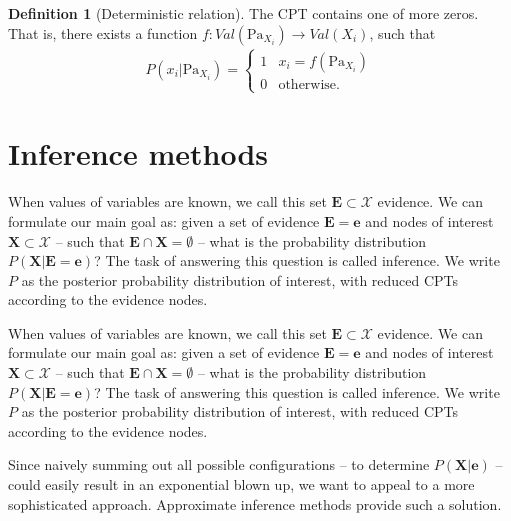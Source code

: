 \documentclass[a4paper, twoside, 11pt]{report}
\theoremstyle{plain}
\theoremstyle{definition}
\newtheorem{definition}[thm]{Definition}
\theoremstyle{remark}
\newcommand{\X}{{\mathcal{X}}}
\newcommand{\bfe}{{\mathbf{e}}}
\newcommand{\bfX}{{\mathbf{X}}}
\newcommand{\bfE}{{\mathbf{E}}}
\begin{document}
\begin{definition}[Deterministic relation]
The CPT contains one of more zeros. That is, there exists a function $f: Val(\text{Pa}_{X_i}) \to Val(X_i)$, such that
\begin{align*}
P(x_i | \text{Pa}_{X_i}) =
\begin{cases}
1 & x_i = f(\text{Pa}_{X_i}) \\ 
0 & \text{otherwise}.
\end{cases}
\end{align*} 
\end{definition}


\section{Inference methods}
When values of variables are known, we call this set $\bfE \subset \X$ evidence. We can formulate our main goal as: given a set of evidence $\bfE = \bfe$ and nodes of interest $\bfX \subset \X$ -- such that $\bfE \cap \bfX = \emptyset$ -- what is the probability distribution $P(\bfX | \bfE = \bfe)$? The task of answering this question is called inference. We write $P$ as the posterior probability distribution of interest, with reduced CPTs according to the evidence nodes.

When values of variables are known, we call this set $\bfE \subset \X$ evidence. We can formulate our main goal as: given a set of evidence $\bfE = \bfe$ and nodes of interest $\bfX \subset \X$ -- such that $\bfE \cap \bfX = \emptyset$ -- what is the probability distribution $P(\bfX | \bfE = \bfe)$? The task of answering this question is called inference. We write $P$ as the posterior probability distribution of interest, with reduced CPTs according to the evidence nodes.

Since naively summing out all possible configurations -- to determine $P(\bfX | \bfe)$ -- could easily result in an exponential blown up, we want to appeal to a more sophisticated approach. Approximate inference methods provide such a solution.


\end{document}
